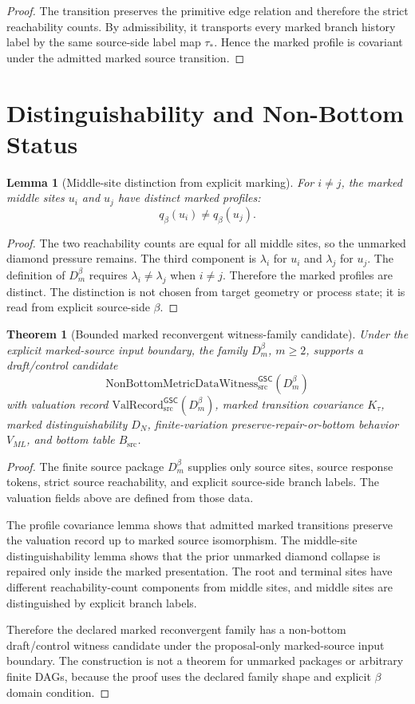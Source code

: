\documentclass[11pt]{article}
\newcommand{\Witness}{\mathrm{NonBottomMetricDataWitness}_{\mathrm{src}}^{\mathsf{GSC}}}
\newcommand{\ValRecord}{\mathrm{ValRecord}_{\mathrm{src}}^{\mathsf{GSC}}}
\newcommand{\Dmbeta}{D_m^{\beta}}
\newtheorem{lemma}{Lemma}
\newtheorem{theorem}{Theorem}
\begin{document}
\begin{proof}
The transition preserves the primitive edge relation and therefore the strict
reachability counts. By admissibility, it transports every marked branch
history label by the same source-side label map \(\tau_\ast\). Hence the
marked profile is covariant under the admitted marked source transition.
\end{proof}

\section{Distinguishability and Non-Bottom Status}

\begin{lemma}[Middle-site distinction from explicit marking]
For \(i\ne j\), the marked middle sites \(u_i\) and \(u_j\) have distinct
marked profiles:
\[
q_\beta(u_i)\ne q_\beta(u_j).
\]
\end{lemma}

\begin{proof}
The two reachability counts are equal for all middle sites, so the unmarked
diamond pressure remains. The third component is \(\lambda_i\) for \(u_i\) and
\(\lambda_j\) for \(u_j\). The definition of \(\Dmbeta\) requires
\(\lambda_i\ne\lambda_j\) when \(i\ne j\). Therefore the marked profiles are
distinct. The distinction is not chosen from target geometry or process
state; it is read from explicit source-side \(\beta\).
\end{proof}

\begin{theorem}[Bounded marked reconvergent witness-family candidate]
Under the explicit marked-source input boundary, the family
\(\Dmbeta\), \(m\ge 2\), supports a draft/control candidate
\[
  \Witness(\Dmbeta)
\]
with valuation record \(\ValRecord(\Dmbeta)\), marked transition covariance
\(K_\tau\), marked distinguishability \(D_N\), finite-variation
preserve-repair-or-bottom behavior \(V_{ML}\), and bottom table
\(B_{\mathrm{src}}\).
\end{theorem}

\begin{proof}
The finite source package \(\Dmbeta\) supplies only source sites, source
response tokens, strict source reachability, and explicit source-side branch
labels. The valuation fields above are defined from those data.

The profile covariance lemma shows that admitted marked transitions preserve
the valuation record up to marked source isomorphism. The middle-site
distinguishability lemma shows that the prior unmarked diamond collapse is
repaired only inside the marked presentation. The root and terminal sites have
different reachability-count components from middle sites, and middle sites
are distinguished by explicit branch labels.

Therefore the declared marked reconvergent family has a non-bottom
draft/control witness candidate under the proposal-only marked-source input
boundary. The construction is not a theorem for unmarked packages or arbitrary
finite DAGs, because the proof uses the declared family shape and explicit
\(\beta\) domain condition.
\end{proof}
\end{document}
